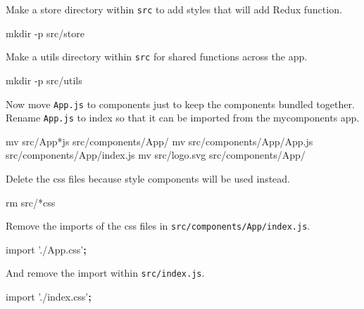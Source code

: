 \documentclass[]{book}
\newenvironment{Shaded}{\begin{snugshade}}{\end{snugshade}}
\newcommand{\KeywordTok}[1]{\textcolor[rgb]{0.13,0.29,0.53}{\textbf{#1}}}
\newcommand{\StringTok}[1]{\textcolor[rgb]{0.31,0.60,0.02}{#1}}
\newcommand{\FunctionTok}[1]{\textcolor[rgb]{0.00,0.00,0.00}{#1}}
\newcommand{\ExtensionTok}[1]{#1}
\newcommand{\NormalTok}[1]{#1}
\begin{document}
Make a store directory within \texttt{src} to add styles that will add
Redux function.

\begin{Shaded}
\begin{Highlighting}[]
\FunctionTok{mkdir}\NormalTok{ -p src/store}
\end{Highlighting}
\end{Shaded}

Make a utils directory within \texttt{src} for shared functions across
the app.

\begin{Shaded}
\begin{Highlighting}[]
\FunctionTok{mkdir}\NormalTok{ -p src/utils}
\end{Highlighting}
\end{Shaded}

Now move \texttt{App.js} to components just to keep the components
bundled together. Rename \texttt{App.js} to index so that it can be
imported from the mycomponents app.

\begin{Shaded}
\begin{Highlighting}[]
\FunctionTok{mv}\NormalTok{ src/App*js src/components/App/}
\FunctionTok{mv}\NormalTok{ src/components/App/App.js src/components/App/index.js}
\FunctionTok{mv}\NormalTok{ src/logo.svg src/components/App/}
\end{Highlighting}
\end{Shaded}

Delete the css files because style components will be used instead.

\begin{Shaded}
\begin{Highlighting}[]
\FunctionTok{rm}\NormalTok{ src/*css}
\end{Highlighting}
\end{Shaded}

Remove the imports of the css files in
\texttt{src/components/App/index.js}.

\begin{Shaded}
\begin{Highlighting}[]
\ExtensionTok{import} \StringTok{'./App.css'}\KeywordTok{;}
\end{Highlighting}
\end{Shaded}

And remove the import within \texttt{src/index.js}.

\begin{Shaded}
\begin{Highlighting}[]
\ExtensionTok{import} \StringTok{'./index.css'}\KeywordTok{;}
\end{Highlighting}
\end{Shaded}
\end{document}
